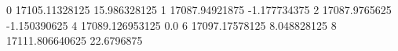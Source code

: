 0 17105.11328125 15.986328125
1 17087.94921875 -1.177734375
2 17087.9765625 -1.150390625
4 17089.126953125 0.0
6 17097.17578125 8.048828125
8 17111.806640625 22.6796875
